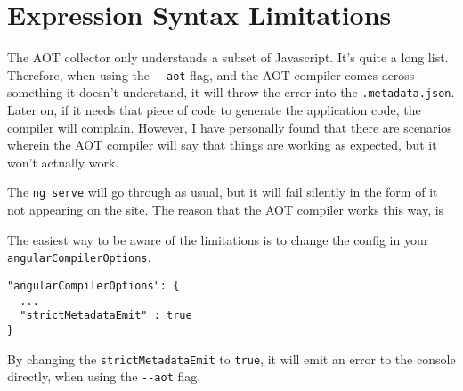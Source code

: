 \section{Expression Syntax Limitations}
The AOT collector only understands a subset of Javascript. It's quite a long 
list. Therefore, when using the \lstinline{--aot} flag, and the AOT compiler 
comes across something it doesn't understand, it will throw the error into 
the \lstinline{.metadata.json}. Later on, if it needs that piece of code 
to generate the application code, the compiler will complain. However, I have 
personally found that there are scenarios wherein the AOT compiler will say
that things are working as expected, but it won't actually work. 

The \lstinline{ng serve} will go through as 
usual, but it will fail silently in the form of it not appearing on the site. 
The reason that the AOT compiler works this way, is 

The easiest way to be aware of the limitations is to change the config 
in your \lstinline{angularCompilerOptions}. 

\begin{lstlisting}
"angularCompilerOptions": {
  ...
  "strictMetadataEmit" : true
}  
\end{lstlisting}

By changing the \lstinline{strictMetadataEmit} to \lstinline{true}, it will
emit an error to the console directly, when using the \lstinline{--aot} flag.

